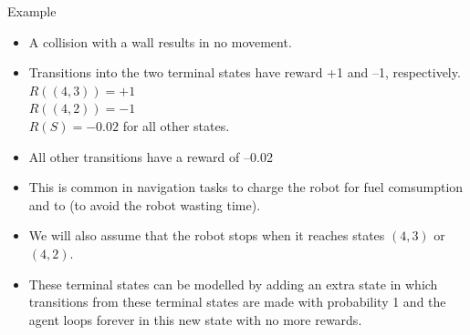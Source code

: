 \documentclass[handout]{beamer}
\begin{document}
\begin{frame}{Example}
\scriptsize{
\begin{itemize}
\item A collision with a wall results in no movement.

\item Transitions into the two terminal states have reward +1 and –1, respectively. \\
$R((4,3)) = +1$ \\
$R((4,2)) = -1$ \\
$R(S) = -0.02$ for all other states.

\item All other transitions have a reward of –0.02 
\item This is common in navigation tasks to charge the robot for fuel comsumption and to (to avoid the robot wasting time).

\item We will also assume that the robot stops when it reaches states $(4,3)$ or $(4,2)$.

\item These terminal states can be modelled by adding an extra state in which transitions from these terminal states are made with probability 1 and the agent loops forever in this new state with no more rewards.

\end{itemize}


} 

\end{frame}
\end{document}
